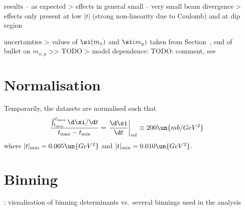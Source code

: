 \> results -- as expected
\>> effects in general small -- very small beam divergence
\>> effects only present at low $|t|$ (strong non-linearity due to Coulomb) and at dip region

\> uncertainties
\>> values of $\si(m_x)$ and $\si(m_y)$ taken from Section~, end of bullet on $m_{x,y}$
\>>> TODO
\>> model dependence: TODO: comment, see 


\chapter[normalisation]{Normalisation}

Temporarily, the datasets are normalised such that
$${\int_{t_{\rm min}}^{t_{\rm max}} \d\si/\d t\over t_{\rm max} - t_{\rm min} } = \left.{\d\si\over \d t}\right|_{\rm ref} \equiv 200 \un{mb/GeV^2}$$
where $|t|_{\rm min} = 0.005\un{GeV^2}$ and $|t|_{\rm min} = 0.010\un{GeV^2}$.

\iffalse

\> method
\>> normalise $\d\si/\d t$ such that $I + S = 31.0\un{mb}$ (this value should be approved in a meeting on 23 Oct 2017)
\>> $I$ stands for $\d\si/\d t$ fit over $0.01 < |t| < 0.05\un{GeV^2}$, integrated over $0 < |t| < 0.01\un{GeV^2}$
\>> $S$ stands for histogram integral of bins $0.01 < |t| < 0.5\un{GeV^2}$

\fi



\chapter[binning]{Binning}

\iffalse

\> method: binning ``ob-$\langle n\rangle$-$\langle u\rangle$-$\langle w_m\rangle$`` is built as follows
\>> at low $|t|$ ($|t| \ls 0.4\un{GeV^2}$): bin size about $n\times \si(\hbox{$t$ smearing})$
\>> at mid $|t|$: bin size for a fixed statistical uncertainty $u\un{\%}$
\>> if needed at large $|t|$: constant bin size $w_m$ (in $\rm GeV^2$) to avoid excessively large bins

\> binnings used in analysis
\>> ob-1-20-0.05
\>> ob-2-10-0.05
\>> ob-3-5-0.05
\fi

\>  : visualisation of binning determinants vs.~several binnings used in the analysis

